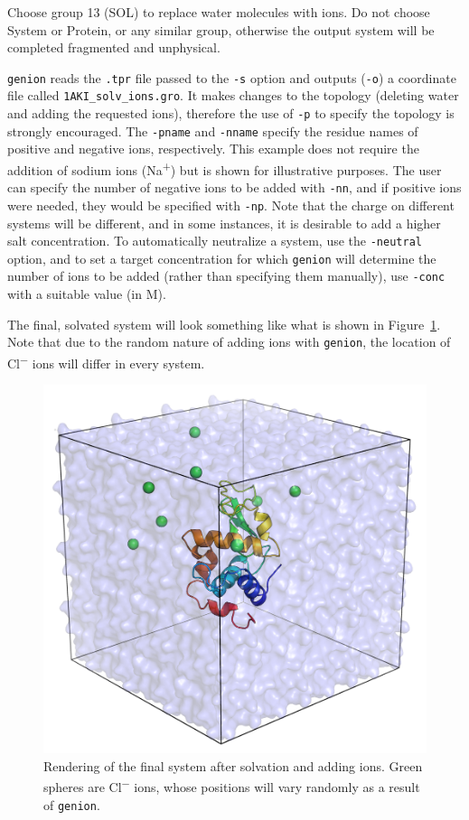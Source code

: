 \documentclass[9pt,tutorial]{livecoms}
\begin{document}
Choose group 13 (SOL) to replace water molecules with ions. Do not choose System or Protein, or any similar group, otherwise the output system will be completed fragmented and unphysical.

\texttt{genion} reads the \texttt{.tpr} file passed to the \texttt{-s} option and outputs (\texttt{-o}) a coordinate file called \texttt{1AKI\_solv\_ions.gro}. It makes changes to the topology (deleting water and adding the requested ions), therefore the use of \texttt{-p} to specify the topology is strongly encouraged. The \texttt{-pname} and \texttt{-nname} specify the residue names of positive and negative ions, respectively. This example does not require the addition of sodium ions (Na\textsuperscript{+}) but is shown for illustrative purposes. The user can specify the number of negative ions to be added with \texttt{-nn}, and if positive ions were needed, they would be specified with \texttt{-np}. Note that the charge on different systems will be different, and in some instances, it is desirable to add a higher salt concentration. To automatically neutralize a system, use the \texttt{-neutral} option, and to set a target concentration for which \texttt{genion} will determine the number of ions to be added (rather than specifying them manually), use \texttt{-conc} with a suitable value (in M).

The final, solvated system will look something like what is shown in Figure~\ref{lyso_solv_ions_fig}. Note that due to the random nature of adding ions with \texttt{genion}, the location of Cl\textsuperscript{$-$} ions will differ in every system.

\begin{figure}[h]
\centering
\includegraphics{1AKI_solv_ions}
\caption{Rendering of the final system after solvation and adding ions. Green spheres are Cl\textsuperscript{$-$} ions, whose positions will vary randomly as a result of \texttt{genion}.}
\label{lyso_solv_ions_fig}
\end{figure}
\end{document}
